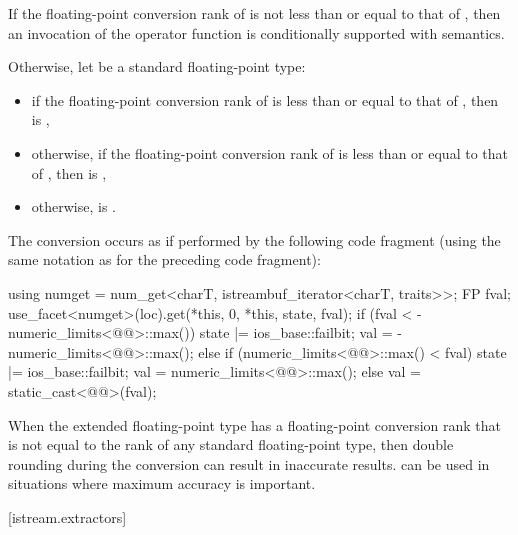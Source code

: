\begin{itemdescr}
\pnum
If
the floating-point conversion rank of 
is not less than or equal to that of ,
then an invocation of the operator function is conditionally supported
with 
semantics.

\pnum
Otherwise, let  be a standard floating-point type:
\begin{itemize}
\item
if the floating-point conversion rank of 
is less than or equal to that of ,
then  is ,
\item
otherwise,
if the floating-point conversion rank of 
is less than or equal to that of ,
then  is ,
\item
otherwise,  is .
\end{itemize}

\pnum
The conversion occurs as if performed by the following code fragment
(using the same notation as for the preceding code fragment):
\begin{codeblock}
using numget = num_get<charT, istreambuf_iterator<charT, traits>>;
FP fval;
use_facet<numget>(loc).get(*this, 0, *this, state, fval);
if (fval < -numeric_limits<@@>::max()) {
  state |= ios_base::failbit;
  val = -numeric_limits<@@>::max();
} else if (numeric_limits<@@>::max() < fval) {
  state |= ios_base::failbit;
  val = numeric_limits<@@>::max();
} else {
  val = static_cast<@@>(fval);
}
\end{codeblock}
\begin{note}
When the extended floating-point type has
a floating-point conversion rank
that is not equal to the rank of any standard floating-point type,
then double rounding during the conversion can result in inaccurate results.
 can be used in situations
where maximum accuracy is important.
\end{note}
\end{itemdescr}

[istream.extractors]{}

